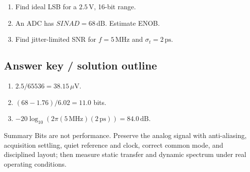\documentclass[10pt,letterpaper]{article}
\begin{document}
\begin{enumerate}
  \item Find ideal LSB for a $2.5\,\mathrm{V}$, 16-bit range.
  \item An ADC has $SINAD=68\,\mathrm{dB}$. Estimate ENOB.
  \item Find jitter-limited SNR for $f=5\,\mathrm{MHz}$ and $\sigma_t=2\,\mathrm{ps}$.
\end{enumerate}\subsection{Answer key / solution outline}
\begin{enumerate}
  \item $2.5/65536=38.15\,\mu\mathrm{V}$.
  \item $(68-1.76)/6.02=11.0$ bits.
  \item $-20\log_{10}(2\pi(5\,\mathrm{MHz})(2\,\mathrm{ps}))=84.0\,\mathrm{dB}$.
\end{enumerate}\begin{CornellSummaryBox}{Summary}
Bits are not performance. Preserve the analog signal with anti-aliasing, acquisition settling, quiet reference and clock, correct common mode, and disciplined layout; then measure static transfer and dynamic spectrum under real operating conditions.
\end{CornellSummaryBox}
\end{document}
